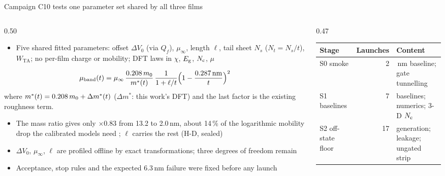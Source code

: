 \begin{frame}[t]{Campaign C10 tests one parameter set shared by all three films}
  \fourTop
  \begin{columns}[T,onlytextwidth]
    \begin{column}{0.50\textwidth}
      \begin{itemize}\footnotesize
        \item Five shared fitted parameters: offset $\Delta V_0$ (via $Q_f$), $\mu_\infty$, length $\ell$, tail sheet
          $N_s$ ($N_t = N_s/t$), $W_\mathrm{TA}$; no per-film charge or mobility; DFT laws in $\chi$, $E_{\mathrm{g}}$, $N_{\mathrm{c}}$,
          $\mu$
      \end{itemize}
      {\footnotesize\fourEqSkip
      \[ \mu_\mathrm{band}(t) = \mu_\infty\,\frac{0.208\,m_0}{m^{*}(t)}\,\frac{1}{1+\ell/t}
         \Big(1-\frac{0.287\,\mathrm{nm}}{t}\Big)^{2} \]
      where $m^{*}(t) = 0.208\,m_0 + \Delta m^{*}(t)$ ($\Delta m^{*}$: this work's DFT) and the last factor is the
      existing roughness term.\par}
      \begin{itemize}\footnotesize
        \item The mass ratio gives only $\times0.83$ from 13.2 to 2.0\,nm, about 14\,\% of the logarithmic mobility
          drop the calibrated models need ; $\ell$ carries the rest (H-D, sealed)
        \item $\Delta V_0$, $\mu_\infty$, $\ell$ are profiled offline by exact transformations; three degrees of
          freedom remain
        \item Acceptance, stop rules and the expected 6.3\,nm failure were fixed before any launch
      \end{itemize}
    \end{column}
    \begin{column}{0.47\textwidth}
      {\scriptsize
      \setlength{\tabcolsep}{3pt}
      \renewcommand{\arraystretch}{1.08}
      \begin{tabularx}{\linewidth}{@{}l r>{\raggedright\arraybackslash}X@{}}
        \toprule
        Stage & Launches & Content \\
        \midrule
        S0 smoke & 2 & 2.0\,nm baseline; gate tunnelling \\
        S1 baselines & 7 & baselines; numerics; 3-D $N_{\mathrm{c}}$ \\
        \midrule
        S2 off-state floor & 17 & generation; leakage; ungated strip \\

\end{tabularx}}
\end{column}
\end{columns}
\end{frame}
